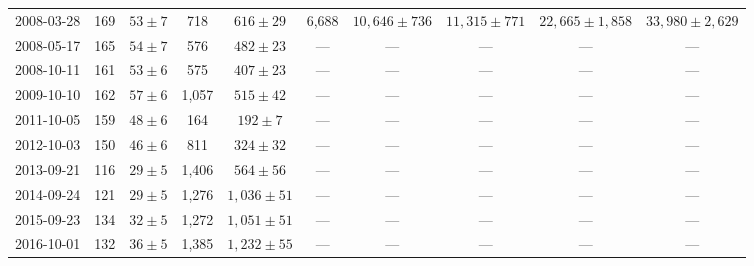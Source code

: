 \begin{landscape}
\begin{longtable}{cccccccccc}
{2008-03-28} & 169 & {$53  \pm  7$} & 718 & {$616 \pm 29$} & 6,688 & {$10,646 \pm 736$} & {$11,315 \pm 771$} & {$22,665 \pm 1,858$} & {$33,980 \pm 2,629$} \\
{2008-05-17} & 165 & {$54  \pm  7$} & 576 & {$482 \pm 23$} & --- & --- & --- & --- & --- \\
{2008-10-11} & 161 & {$53  \pm  6$} & 575 & {$407 \pm 23$} & --- & --- & --- & --- & --- \\
{2009-10-10} & 162 & {$57  \pm  6$} & 1,057 & {$515 \pm 42$} & --- & --- & --- & --- & --- \\
{2011-10-05} & 159 & {$48  \pm  6$} & 164 & {$192 \pm 7$} & --- & --- & --- & --- & --- \\
{2012-10-03} & 150 & {$46  \pm  6$} & 811 & {$324 \pm 32$} & --- & --- & --- & --- & --- \\
{2013-09-21} & 116 & {$29  \pm  5$} & 1,406 & {$564 \pm 56$} & --- & --- & --- & --- & --- \\
{2014-09-24} & 121 & {$29  \pm  5$} & 1,276 & {$1,036 \pm 51$} & --- & --- & --- & --- & --- \\
{2015-09-23} & 134 & {$32  \pm  5$} & 1,272 & {$1,051 \pm 51$} & --- & --- & --- & --- & --- \\
{2016-10-01} & 132 & {$36  \pm  5$} & 1,385 & {$1,232 \pm 55$} & --- & --- & --- & --- & --- \\
\end{longtable} 
\end{landscape} 
